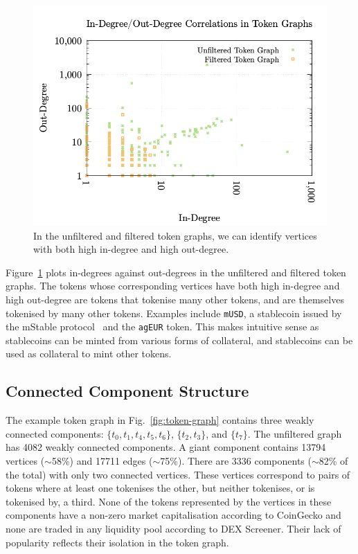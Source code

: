\begin{figure}
  \centerline{\includegraphics[width=\columnwidth]{img/degree-distributions/token-graph-in-out-degrees.png}}
  \caption{In the unfiltered and filtered token graphs, we can
    identify vertices with both high in-degree and high
    out-degree.}\label{fig:token-graph-in-out-degrees}
\end{figure}

Figure~\ref{fig:token-graph-in-out-degrees} plots in-degrees against
out-degrees in the unfiltered and filtered token graphs.  The tokens
whose corresponding vertices have both high in-degree and high
out-degree are tokens that tokenise many other tokens, and are
themselves tokenised by many other tokens.  Examples include
\texttt{mUSD}, a stablecoin issued by the mStable
protocol~\cite{mstable-xx} and the \texttt{agEUR} token.  This makes
intuitive sense as stablecoins can be minted from various forms of
collateral, and stablecoins can be used as collateral to mint other
tokens.

\subsection{Connected Component Structure}\label{sec:analysis-component-structure}

The example token graph in Fig.~\ref{fig:token-graph} contains three
weakly connected components: $\{t_0, t_1, t_4, t_5, t_6\}$, $\{t_2,
t_3\}$, and $\{t_7\}$.  The unfiltered graph has \num{4082} weakly
connected components.  A giant component contains \num{13794} vertices
($\sim$\num{58}\%) and \num{17711} edges ($\sim$\num{75}\%).  There
are \num{3336} components ($\sim$\num{82}\% of the total) with only
two connected vertices.  These vertices correspond to pairs of tokens
where at least one tokenises the other, but neither tokenises, or is
tokenised by, a third.  None of the tokens represented by the vertices
in these components have a non-zero market capitalisation according to
CoinGecko and none are traded in any liquidity pool according to DEX
Screener.  Their lack of popularity reflects their isolation in the
token graph.


